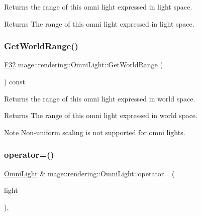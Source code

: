 Returns the range of this omni light expressed in light space.

\begin{DoxyReturn}{Returns}
The range of this omni light expressed in light space. 
\end{DoxyReturn}
\mbox{\label{classmage_1_1rendering_1_1_omni_light_a7be27af3b3e5d11806396ce8f619223f}} 
\subsubsection{\texorpdfstring{Get\+World\+Range()}{GetWorldRange()}}
{\footnotesize\ttfamily \mbox{\hyperlink{namespacemage_aa97e833b45f06d60a0a9c4fc22ae02c0}{F32}} mage\+::rendering\+::\+Omni\+Light\+::\+Get\+World\+Range (\begin{DoxyParamCaption}{ }\end{DoxyParamCaption}) const\hspace{0.3cm}{\ttfamily [noexcept]}}

Returns the range of this omni light expressed in world space.

\begin{DoxyReturn}{Returns}
The range of this omni light expressed in world space. 
\end{DoxyReturn}
\begin{DoxyNote}{Note}
Non-\/uniform scaling is not supported for omni lights. 
\end{DoxyNote}
\mbox{\label{classmage_1_1rendering_1_1_omni_light_aac914061f6798131e7f59275b4716b48}} 
\subsubsection{\texorpdfstring{operator=()}{operator=()}\hspace{0.1cm}{\footnotesize\ttfamily [1/2]}}
{\footnotesize\ttfamily \mbox{\hyperlink{classmage_1_1rendering_1_1_omni_light}{Omni\+Light}} \& mage\+::rendering\+::\+Omni\+Light\+::operator= (\begin{DoxyParamCaption}\item[{const \mbox{\hyperlink{classmage_1_1rendering_1_1_omni_light}{Omni\+Light}} \&}]{light }\end{DoxyParamCaption})\hspace{0.3cm}{\ttfamily [default]}, {\ttfamily [noexcept]}}

